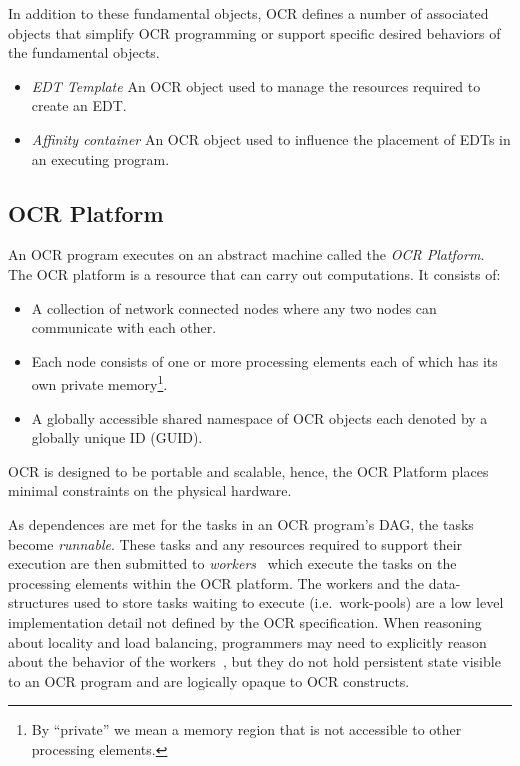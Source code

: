 In addition to these fundamental objects, OCR defines a number of
associated objects that simplify OCR programming or support specific
desired behaviors of the fundamental objects.
\begin{itemize}
\item \emph{EDT Template} An OCR object used to manage the resources
required to create an EDT.
\item \emph{Affinity container} An OCR object used to influence the
placement of EDTs in an executing program.
\end{itemize}


\subsection{OCR Platform}
\label{sec:OCRPlatform}

An OCR program executes on an abstract machine called the \emph{OCR
Platform}.  The OCR platform is a resource that can carry out
computations. It consists of:
\begin{itemize}
\item A collection of network connected nodes where any two nodes can
communicate with each other.
\item Each node consists of one or more processing elements each of
which has its own private memory\footnote{By ``private'' we mean a
memory region that is not accessible to other processing
elements.}.
\item A globally accessible shared namespace of OCR objects each
denoted by a globally unique ID (GUID).
\end{itemize}
OCR is designed to be portable and scalable, hence, the OCR Platform
places minimal constraints on the physical hardware.

As dependences are met for the tasks in an OCR program's DAG, the
tasks become \emph{runnable}. These tasks and any resources required
to support their execution are then submitted to
\emph{workers}~\cite{GBRS09} which execute the tasks on
the processing elements within the OCR platform. The workers and the
data-structures used to store tasks waiting to execute
(i.e.\ work-pools) are a low level implementation detail not defined by
the OCR specification. When reasoning about locality and load
balancing, programmers may need to explicitly reason about the
behavior of the workers~\cite{Chatterjee13}, but they do not hold
persistent state visible to an OCR program and are logically opaque to
OCR constructs.
%
%

